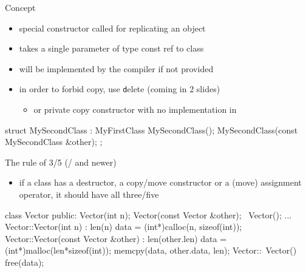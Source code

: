 \begin{frame}[fragile]
  \begin{block}{Concept}
    \begin{itemize}
    \item special constructor called for replicating an object
    \item takes a single parameter of type const ref to class
    \item will be implemented by the compiler if not provided
    \item in order to forbid copy, use {\texttt delete} (coming in 2 slides)
      \begin{itemize}
      \item or private copy constructor with no implementation in 
      \end{itemize}
    \end{itemize}
  \end{block}
  \pause
  \begin{cppcode}
    struct MySecondClass : MyFirstClass {
      MySecondClass();
      MySecondClass(const MySecondClass &other);
    };
  \end{cppcode}
  \pause
  \begin{exampleblock}{The rule of 3/5 (/ and newer)}
    \begin{itemize}
    \item if a class has a destructor, a copy/move constructor or a (move) assignment operator, it should have all three/five
    \end{itemize}
  \end{exampleblock}
\end{frame}

\begin{frame}[fragile]
  \begin{cppcode}
    class Vector {
    public:
      Vector(int n);
      Vector(const Vector &other);
      ~Vector();
      ...
    }
    Vector::Vector(int n) : len(n) {
      data = (int*)calloc(n, sizeof(int));
    }
    Vector::Vector(const Vector &other) : len(other.len) {
      data = (int*)malloc(len*sizeof(int));
      memcpy(data, other.data, len);
    }
    Vector::~Vector() { free(data); }
  \end{cppcode}
\end{frame}

